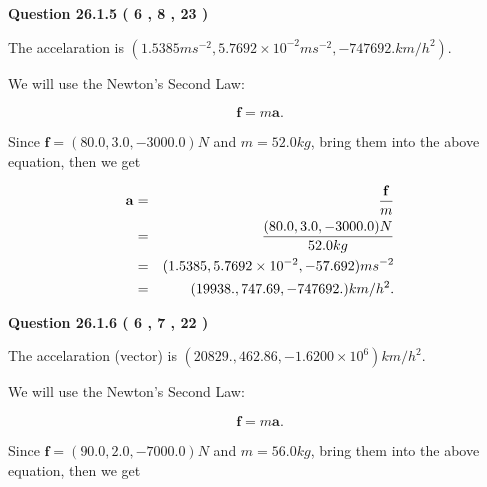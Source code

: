 \documentclass[12pt]{article}
\begin{document}
{\textbf{\Large{Question
26.1.5 
 (           6 ,           8 ,          23 )
}}}
  
  
 
 
\noindent{}
 
 
The accelaration is
$(
1.5385ms^{-2},
5.7692 \times 10^{-2}ms^{-2},
-747692.km/h^2
).
$
 
 
 
 
 
 
\noindent{}

We will use the Newton's Second Law:
 
\[
\mathbf{f}=m\mathbf{a}.
\]
 
Since $\mathbf{f}=( %
80.0,  %
3.0,  %
-3000.0 )N$
and $m= %
52.0kg$, bring them into the above equation, then we get
 
\begin{eqnarray*}
\mathbf{a}&=&\frac{\mathbf{f}}m  \\
&=&\frac{(
80.0 ,
3.0 ,
-3000.0 )N
}{ %
52.0 kg}  \\
&=&(
1.5385 ,
5.7692 \times 10^{-2},
-57.692
)ms^{-2} \\
&=&(
19938. ,
747.69 ,
-747692.
)km/h^2.
\end{eqnarray*}
 
 
 
  
\vspace{0.2in}
  
{\textbf{\Large{Question
26.1.6 
 (           6 ,           7 ,          22 )
}}}
  
  
 
 
\noindent{}
 
 
The accelaration (vector) is
$(
20829.,
462.86 ,
-1.6200 \times 10^{6}
)km/h^2.
$
 
 
 
 
 
 
\noindent{}

We will use the Newton's Second Law:
 
\[
\mathbf{f}=m\mathbf{a}.
\]
 
Since $\mathbf{f}=( %
90.0,  %
2.0,  %
-7000.0 )N$
and $m= %
56.0 kg$, bring them into the above equation, then we get
 
\end{document}
